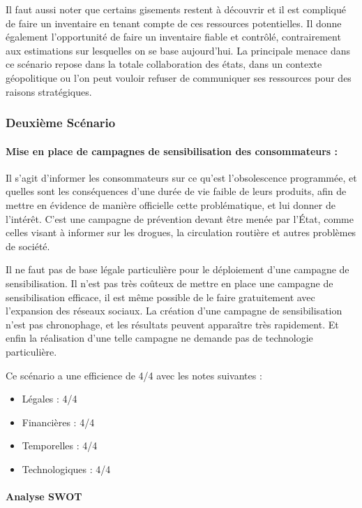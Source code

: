 Il faut aussi noter que certains gisements restent à découvrir et il est compliqué de faire un inventaire en tenant compte de ces ressources potentielles.
Il donne également l’opportunité de faire un inventaire fiable et contrôlé, contrairement aux estimations sur lesquelles on se base aujourd’hui.
\medbreak
La principale menace dans ce scénario repose dans la totale collaboration des états, dans un contexte géopolitique ou l’on peut vouloir refuser de communiquer ses ressources pour des raisons stratégiques.


\subsubsection{Deuxième Scénario}

\paragraph{Mise en place de campagnes de sensibilisation des consommateurs :}

\medbreak
Il s’agit d’informer les consommateurs sur ce qu’est l’obsolescence programmée, et quelles sont les conséquences d’une durée de vie faible de leurs produits, afin de mettre en évidence de manière officielle cette problématique, et lui donner de l'intérêt. C’est une campagne de prévention devant être menée par l’État, comme celles visant à informer sur les drogues, la circulation routière et autres problèmes de société.

\medbreak
Il ne faut pas de base légale particulière pour le déploiement d’une campagne de sensibilisation.
Il n’est pas très coûteux de mettre en place une campagne de sensibilisation efficace, il est même possible de le faire gratuitement avec l'expansion des réseaux sociaux.
La création d’une campagne de sensibilisation n’est pas chronophage, et les résultats peuvent apparaître très rapidement.
Et enfin la réalisation d’une telle campagne ne demande pas de technologie particulière.

Ce scénario a une efficience de 4/4 avec les notes suivantes :
\begin{itemize}
\item Légales : 4/4
\item Financières : 4/4
\item Temporelles : 4/4
\item Technologiques : 4/4
\end{itemize}

\paragraph{Analyse SWOT}

